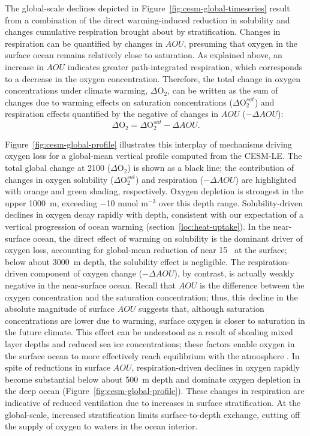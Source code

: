 \documentclass{report_chapter}
\begin{document}
The global-scale \OO{} declines depicted in Figure~\ref{fig:cesm-global-timeseries} result from a combination of the direct warming-induced reduction in solubility and changes cumulative respiration brought about by stratification.
Changes in respiration can be quantified by changes in $AOU$, presuming that oxygen in the surface ocean remains relatively close to saturation.
As explained above, an increase in $AOU$ indicates greater path-integrated respiration, which corresponds to a decrease in the oxygen concentration.
Therefore, the total change in oxygen concentrations under climate warming, $\Delta\mathrm{O}_2$, can be written as the sum of changes due to warming effects on saturation concentrations ($\Delta\mathrm{O}_2^{sat}$) and respiration effects quantified by the negative of changes in $AOU$ ($-\Delta AOU$):
\begin{equation}
\Delta\mathrm{O}_2 = \Delta\mathrm{O}_2^{sat} - \Delta AOU.
\label{eqn:o2-change}
\end{equation}

Figure~\ref{fig:cesm-global-profile} illustrates this interplay of mechanisms driving oxygen loss for a global-mean vertical profile computed from the CESM-LE.
The total global \OO{} change at 2100 ($\Delta\mathrm{O}_2$) is shown as a black line; the contribution of changes in oxygen solubility ($\Delta\mathrm{O}_2^{sat}$) and respiration ($-\Delta AOU$) are highlighted with orange and green shading, respectively.
Oxygen depletion is strongest in the upper 1000~m, exceeding $-$10 mmol m$^{-3}$ over this depth range.
Solubility-driven declines in oxygen decay rapidly with depth, consistent with our expectation of a vertical progression of ocean warming (section~\ref{loc:heat-uptake}).
In the near-surface ocean, the direct effect of warming on solubility is the dominant driver of oxygen loss, accounting for global-mean reduction of near 15~\mmolmmm{} at the surface; below about 3000~m depth, the solubility effect is negligible.
The respiration-driven component of oxygen change ($-\Delta AOU$), by contrast, is actually weakly negative in the near-surface ocean.
Recall that $AOU$ is the difference between the oxygen concentration and the saturation concentration; thus, this decline in the absolute magnitude of surface $AOU$ suggests that, although saturation concentrations are lower due to warming, surface oxygen is closer to saturation in the future climate.
This effect can be understood as a result of shoaling mixed layer depths and reduced sea ice concentrations; these factors enable oxygen in the surface ocean to more effectively reach equilibrium with the atmosphere \citep{Ito-Follows-etal-2004}.
In spite of reductions in surface $AOU$, respiration-driven declines in oxygen rapidly become substantial below about 500~m depth and dominate oxygen depletion in the deep ocean (Figure~\ref{fig:cesm-global-profile}).
These changes in respiration are indicative of reduced ventilation due to increases in surface stratification.
At the global-scale, increased stratification limits surface-to-depth exchange, cutting off the supply of oxygen to waters in the ocean interior.
\end{document}

